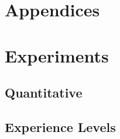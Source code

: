 \begin{appendix}
    \chapter*{Appendices}
    \label{cha:appendices}




    \chapter{Experiments}
    \label{app:experiments}

    \section{Quantitative}
    \label{appsec:questions-and-answer}

    
    \newpage
    

    \newpage

    \section{Experience Levels}
    
    \newpage
    



\end{appendix}